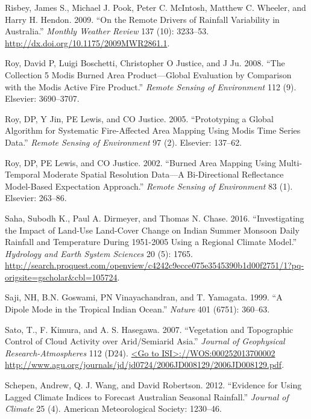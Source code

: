 \documentclass[]{elsarticle} %
\theoremstyle{definition}
\theoremstyle{definition}
\theoremstyle{definition}
\theoremstyle{remark}
\begin{document}
\hypertarget{ref-Risbey2009}{}
Risbey, James S., Michael J. Pook, Peter C. McIntosh, Matthew C.
Wheeler, and Harry H. Hendon. 2009. ``On the Remote Drivers of Rainfall
Variability in Australia.'' \emph{Monthly Weather Review} 137 (10):
3233--53. \url{http://dx.doi.org/10.1175/2009MWR2861.1}.

\hypertarget{ref-Roy2008}{}
Roy, David P, Luigi Boschetti, Christopher O Justice, and J Ju. 2008.
``The Collection 5 Modis Burned Area Product---Global Evaluation by
Comparison with the Modis Active Fire Product.'' \emph{Remote Sensing of
Environment} 112 (9). Elsevier: 3690--3707.

\hypertarget{ref-Roy2005}{}
Roy, DP, Y Jin, PE Lewis, and CO Justice. 2005. ``Prototyping a Global
Algorithm for Systematic Fire-Affected Area Mapping Using Modis Time
Series Data.'' \emph{Remote Sensing of Environment} 97 (2). Elsevier:
137--62.

\hypertarget{ref-Roy2002}{}
Roy, DP, PE Lewis, and CO Justice. 2002. ``Burned Area Mapping Using
Multi-Temporal Moderate Spatial Resolution Data---A Bi-Directional
Reflectance Model-Based Expectation Approach.'' \emph{Remote Sensing of
Environment} 83 (1). Elsevier: 263--86.

\hypertarget{ref-saha_investigating_2016}{}
Saha, Subodh K., Paul A. Dirmeyer, and Thomas N. Chase. 2016.
``Investigating the Impact of Land-Use Land-Cover Change on Indian
Summer Monsoon Daily Rainfall and Temperature During 1951-2005 Using a
Regional Climate Model.'' \emph{Hydrology and Earth System Sciences} 20
(5): 1765.
\url{http://search.proquest.com/openview/c4242c9ecce075e3545390b1d00f2751/1?pq-origsite=gscholar\&cbl=105724}.

\hypertarget{ref-Saji1999}{}
Saji, NH, B.N. Goswami, PN Vinayachandran, and T. Yamagata. 1999. ``A
Dipole Mode in the Tropical Indian Ocean.'' \emph{Nature} 401 (6751):
360--63.

\hypertarget{ref-Sato2007}{}
Sato, T., F. Kimura, and A. S. Hasegawa. 2007. ``Vegetation and
Topographic Control of Cloud Activity over Arid/Semiarid Asia.''
\emph{Journal of Geophysical Research-Atmospheres} 112 (D24).
\href{\%3CGo\%20to\%20ISI\%3E://WOS:000252013700002\%20http://www.agu.org/journals/jd/jd0724/2006JD008129/2006JD008129.pdf}{\textless{}Go to ISI\textgreater{}://WOS:000252013700002 http://www.agu.org/journals/jd/jd0724/2006JD008129/2006JD008129.pdf}.

\hypertarget{ref-Schepen2012}{}
Schepen, Andrew, Q. J. Wang, and David Robertson. 2012. ``Evidence for
Using Lagged Climate Indices to Forecast Australian Seasonal Rainfall.''
\emph{Journal of Climate} 25 (4). American Meteorological Society:
1230--46.
\end{document}
